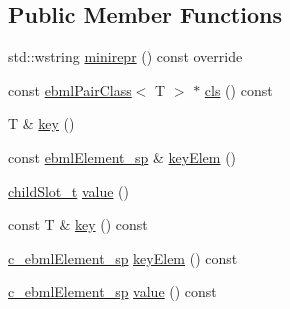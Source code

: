 \subsection*{Public Member Functions}
\begin{DoxyCompactItemize}
\item 
std\+::wstring \mbox{\hyperlink{classebml_1_1ebmlPair_a88a68eed87260a46f40371f14279da4e}{minirepr}} () const override
\item 
const \mbox{\hyperlink{classebml_1_1ebmlPairClass}{ebml\+Pair\+Class}}$<$ T $>$ $\ast$ \mbox{\hyperlink{classebml_1_1ebmlPair_ad1244458e1390cbf567dfd460b0002f2}{cls}} () const
\item 
T \& \mbox{\hyperlink{classebml_1_1ebmlPair_a0989f9878a29f4c67b801a8744447217}{key}} ()
\item 
const \mbox{\hyperlink{namespaceebml_adad533b7705a16bb360fe56380c5e7be}{ebml\+Element\+\_\+sp}} \& \mbox{\hyperlink{classebml_1_1ebmlPair_a7a68c53d993ced2a13ebe81acce74855}{key\+Elem}} ()
\item 
\mbox{\hyperlink{classebml_1_1childSlot__t}{child\+Slot\+\_\+t}} \mbox{\hyperlink{classebml_1_1ebmlPair_a4808e061fa6ea4b11a7e9490c037bba5}{value}} ()
\item 
const T \& \mbox{\hyperlink{classebml_1_1ebmlPair_a0945a9d73fccd6913c0548c62f08c719}{key}} () const
\item 
\mbox{\hyperlink{namespaceebml_a2deef4e8071531b32e3533f1bf978917}{c\+\_\+ebml\+Element\+\_\+sp}} \mbox{\hyperlink{classebml_1_1ebmlPair_ac9269a9e3f807074b21db614b9f4b2ce}{key\+Elem}} () const
\item 
\mbox{\hyperlink{namespaceebml_a2deef4e8071531b32e3533f1bf978917}{c\+\_\+ebml\+Element\+\_\+sp}} \mbox{\hyperlink{classebml_1_1ebmlPair_abfb141bc1df5ab8c20f0d6d931accb67}{value}} () const
\end{DoxyCompactItemize}

